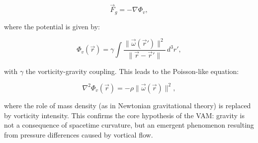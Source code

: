 \begin{equation}
    \vec{F}_g = -\nabla \Phi_v,
\end{equation}

where the potential is given by:

\begin{equation}
    \Phi_v(\vec{r}) = \gamma \int \frac{\|\vec{\omega}(\vec{r}')\|^2}{\|\vec{r} - \vec{r}'\|} \, d^3r',
\end{equation}

with $\gamma$ the vorticity-gravity coupling. This leads to the Poisson-like equation:

\begin{equation}
    \nabla^2 \Phi_v(\vec{r}) = -\rho \|\vec{\omega}(\vec{r})\|^2,
\end{equation}

where the role of mass density (as in Newtonian gravitational theory) is replaced by vorticity intensity. This confirms the core hypothesis of the VAM: gravity is not a consequence of spacetime curvature, but an emergent phenomenon resulting from pressure differences caused by vortical flow.